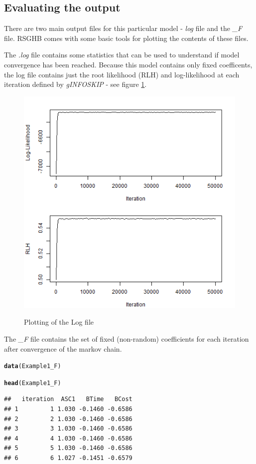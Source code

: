 \documentclass{article}\usepackage[]{graphicx}\usepackage[]{color}
\makeatletter
\newcommand{\hlstd}[1]{\textcolor[rgb]{0.345,0.345,0.345}{#1}}%
\newcommand{\hlkwd}[1]{\textcolor[rgb]{0.737,0.353,0.396}{\textbf{#1}}}%
\newenvironment{kframe}{%
 \def\at@end@of@kframe{}%
 \ifinner\ifhmode%
  \def\at@end@of@kframe{\end{minipage}}%
  \begin{minipage}{\columnwidth}%
 \fi\fi%
 \def\FrameCommand##1{\hskip\@totalleftmargin \hskip-\fboxsep
 \colorbox{shadecolor}{##1}\hskip-\fboxsep
     \hskip-\linewidth \hskip-\@totalleftmargin \hskip\columnwidth}%
 \MakeFramed {\advance\hsize-\width
   \@totalleftmargin\z@ \linewidth\hsize
   \@setminipage}}%
 {\par\unskip\endMakeFramed%
 \at@end@of@kframe}
\newenvironment{knitrout}{}{} %
\makeatother
\begin{document}
\subsection*{Evaluating the output}

There are two main output files for this particular model - \emph{log} file and the \emph{\_F} file. RSGHB comes with some basic tools for plotting the contents of these files.

The \emph{.log} file contains some statistics that can be used to understand if model convergence has been reached. Because this model contains only fixed coefficents, the log file contains just the root likelihood (RLH) and log-likelihood at each iteration defined by \emph{gINFOSKIP} - see figure \ref{logfile1}.

\begin{figure}
\caption{Plotting of the Log file}
\includegraphics[scale=0.50]{MNL_logPlot1.png}
\label{logfile1}
\end{figure}

The \emph{\_F} file contains the set of fixed (non-random) coefficients for each iteration after convergence of the markov chain.

\begin{knitrout}
\color{fgcolor}\begin{kframe}
\begin{alltt}
\hlkwd{data}\hlstd{(Example1_F)}

\hlkwd{head}\hlstd{(Example1_F)}
\end{alltt}
\begin{verbatim}
##   iteration  ASC1   BTime   BCost
## 1         1 1.030 -0.1460 -0.6586
## 2         2 1.030 -0.1460 -0.6586
## 3         3 1.030 -0.1460 -0.6586
## 4         4 1.030 -0.1460 -0.6586
## 5         5 1.030 -0.1460 -0.6586
## 6         6 1.027 -0.1451 -0.6579
\end{verbatim}
\end{kframe}
\end{knitrout}
\end{document}
